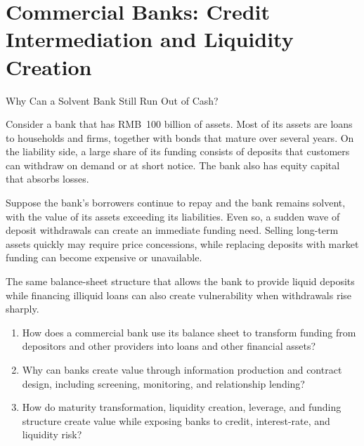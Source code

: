 \chapter{Commercial Banks: Credit Intermediation and Liquidity Creation}
\label{chap:Commercial_Banks_Credit_Intermediation_and_Liquidity_Creation}

\begin{openingcase}{Why Can a Solvent Bank Still Run Out of Cash?}

Consider a bank that has RMB~100 billion of assets. Most of its assets are loans to households and firms, together with bonds that mature over several years. On the liability side, a large share of its funding consists of deposits that customers can withdraw on demand or at short notice. The bank also has equity capital that absorbs losses.

Suppose the bank's borrowers continue to repay and the bank remains solvent, with the value of its assets exceeding its liabilities. Even so, a sudden wave of deposit withdrawals can create an immediate funding need. Selling long-term assets quickly may require price concessions, while replacing deposits with market funding can become expensive or unavailable.

The same balance-sheet structure that allows the bank to provide liquid deposits while financing illiquid loans can also create vulnerability when withdrawals rise sharply.

\end{openingcase}


\begin{tcolorbox}[
  enhanced,
  colback=FinanceBlue!6,
  colframe=FinanceBlue,
  boxrule=0.6pt,
  sharp corners,
  left=8pt,
  right=8pt,
  top=7pt,
  bottom=7pt,
  before skip=1em,
  after skip=1.6em,
  title=\textbf{Core Questions},
  coltitle=white,
  colbacktitle=FinanceBlue,
  fonttitle=\bfseries,
  attach boxed title to top left={xshift=6pt,yshift=-2mm},
  boxed title style={
    boxrule=0pt,
    sharp corners,
    left=5pt,
    right=5pt,
    top=2pt,
    bottom=2pt
  }
]
\begin{enumerate}[
  leftmargin=*,
  label=\textcolor{FinanceBlue}{\textbf{\arabic*.}},
  itemsep=0.55em,
  topsep=0.2em
]


\item How does a commercial bank use its balance sheet to transform funding from depositors and other providers into loans and other financial assets?

\item Why can banks create value through information production and contract design, including screening, monitoring, and relationship lending?

\item How do maturity transformation, liquidity creation, leverage, and funding structure create value while exposing banks to credit, interest-rate, and liquidity risk?

\end{enumerate}
\end{tcolorbox}


